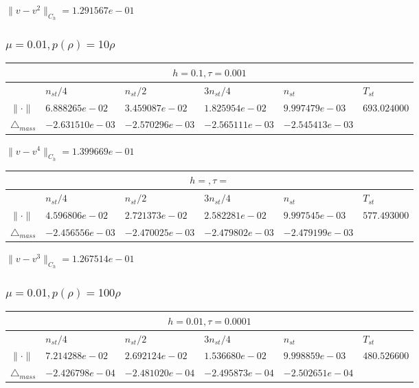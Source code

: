 $\|v-v^{2}\|_{C_h} = 1.291567e-01$

\subsubsection{$\mu = 0.01, p(\rho) = 10\rho $}

\begin{tabular}{*{6}{|l}|}
    \hline
     \\
    \hline
    &$n_{st}/4 $&$ n_{st}/2$&$3n_{st}/4$&$n_{st}$&$T_{st}$ \\
    \hline
$\|\cdot \|$& $6.888265e-02$ & $3.459087e-02$ & $1.825954e-02$ & $9.997479e-03$ &$693.024000$\\
\hline
$\triangle_{mass}$& $-2.631510e-03$ & $-2.570296e-03$ & $-2.565111e-03$ & $-2.545413e-03$ &\\
\hline

\end{tabular}

$\|v-v^{4}\|_{C_h} = 1.399669e-01$

\begin{tabular}{*{6}{|l}|}
    \hline
     \\
    \hline
    &$n_{st}/4 $&$ n_{st}/2$&$3n_{st}/4$&$n_{st}$&$T_{st}$ \\
    \hline
    $\|\cdot \|$& $4.596806e-02$ & $2.721373e-02$ & $2.582281e-02$ & $9.997545e-03$ &$577.493000$\\
\hline
$\triangle_{mass}$& $-2.456556e-03$ & $-2.470025e-03$ & $-2.479802e-03$ & $-2.479199e-03$ &\\
\hline
\end{tabular}

 $\|v-v^{3}\|_{C_h} = 1.267514e-01$
\subsubsection{$\mu = 0.01, p(\rho) = 100\rho $}

\begin{tabular}{*{6}{|l}|}
    \hline
     \\
    \hline
    &$n_{st}/4 $&$ n_{st}/2$&$3n_{st}/4$&$n_{st}$&$T_{st}$ \\
    \hline
$\|\cdot \|$& $7.214288e-02$ & $2.692124e-02$ & $1.536680e-02$ & $9.998859e-03$ &$480.526600$\\
\hline
$\triangle_{mass}$& $-2.426798e-04$ & $-2.481020e-04$ & $-2.495873e-04$ & $-2.502651e-04$ &\\
\hline
\end{tabular}

